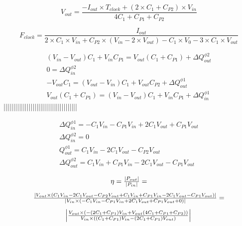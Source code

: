 \documentclass[12pt]{article}
\begin{document}
	{\footnotesize
	\begin{equation}
	V_{out}=\frac{-I_{out}\times T_{clock}+(2\times C_1+C_{P2})\times V_{in}}
	{4C_1+C_{P1}+C_{P2}}
	\end{equation}
	
	{\footnotesize
	\begin{equation}
	F_{clock}=\frac{I_{out}}{2\times C_1\times	V_{in}+C_{P2}\times (V_{in}-2\times V_{out})-C_1\times V_0-3\times C_1\times V_{out}}
	\end{equation} }
	
	{\footnotesize
	\begin{equation}
	\begin{array}{cccc}
	(V_{in}-V_{out})C_1+V_{in}C_{P1}=V_{out}(C_1+C_{P1})+\Delta Q^{\phi 2}_{out}\\ [1em]
	0=\Delta Q^{\phi 2}_{in}\\ [1em]
	-V_{out}C_1=(V_{out}-V_{in})C_1+V_{out}C_{P2}+\Delta Q^{\phi 1}_{out}\\ [1em]
	V_{out}(C_1+C_{P1})=(V_{in}-V_{out})C_1+V_{in}C_{P1}+\Delta Q^{\phi 1}_{in}
	\end{array}
	\end{equation} }
	||||||||||||||||||||||||||||||||||||||
	
	{\footnotesize
	\begin{equation}
	\begin{array}{cccc}
	\Delta Q^{\phi 1}_{in}=-C_1V_{in}-C_{P1}V_{in}+2C_1V_{out}+C_{P1}V_{out}\\ [1em]
	\Delta Q^{\phi 2}_{in}=0\\ [1em]
	Q^{\phi 1}_{out}=C_1V_{in}-2C_1V_{out}-C_{P2}V_{out}\\ [1em]
	\Delta Q^{\phi 2}_{out}=C_1V_{in}+C_{P1}V_{in}-2C_1V_{out}-C_{P1}V_{out}
	\end{array}
	\end{equation} }
	
	{\footnotesize
	\begin{equation}
	\begin{array}{ccc}
	\eta=\frac{|P_{out}|}{|P_{in}|}=\\ [1em]
	\frac{|V_{out}\times (C_1V_{in}-2C_1V_{out}-C_{P2}V_{out}+C_1V_{in}+C_{P1}V_{in}-2C_1V_{out}-C_{P1}V_{out})|}{|V_{in}\times(-C_1V_{in}-C_{P1}V_{in}+2C_1V_{out}+C_{P1}V_{out}+0)|}=\\[1em]
	\abs{\frac{V_{out}\times (-(2C_1+C_{P1})V_{in}+V_{out}(4C_1+C_{P1}+C_{P2}))}{V_{in}\times ((C_1+C_{P1})V_{in}-(2C_1+C_{P1})V_{out})}}
	\end{array}
	\end{equation} }
	
}
\end{document}
